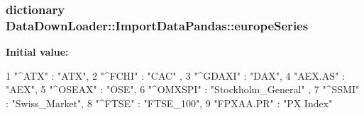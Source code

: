\hypertarget{namespaceDataDownLoader_1_1ImportDataPandas_ad22963cee00cd729bed24ed889c123f2}{
\subsubsection[{europe\-Series}]{\setlength{\rightskip}{0pt plus 5cm}dictionary \-Data\-Down\-Loader\-::\-Import\-Data\-Pandas\-::europe\-Series}}\label{namespaceDataDownLoader_1_1ImportDataPandas_ad22963cee00cd729bed24ed889c123f2}
{\bfseries \-Initial value\-:}
\begin{DoxyCode}
1 {"^ATX" : "ATX",
2 "^FCHI"   : "CAC" ,
3 "^GDAXI"  :  "DAX",
4 "AEX.AS"  :  "AEX",
5 "^OSEAX"   : "OSE",
6 "^OMXSPI"  :  "Stockholm_General" ,
7 "^SSMI"  :  "Swiss_Market",
8 "^FTSE"  :  "FTSE_100",
9 "FPXAA.PR"   : "PX Index"}
\end{DoxyCode}
